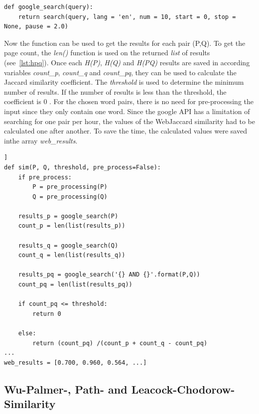 \documentclass[conference]{IEEEtran}
\begin{document}
\begin{lstlisting}[frame=single, label=lst:googlesearch, caption={Google search function}, captionpos=b]
def google_search(query):
    return search(query, lang = 'en', num = 10, start = 0, stop = None, pause = 2.0)
\end{lstlisting}

Now the function can be used to get the results for each pair (P,Q). To get the page count, the \textit{len()} function is used on the returned \textit{list} of results (see~\ref{lst:hpq}). Once each \textit{H(P)}, \textit{H(Q)} and \textit{H(PQ)} results are saved in according variables \textit{count\_p}, \textit{count\_q} and \textit{count\_pq}, they can be used to calculate the Jaccard similarity coefficient. The \textit{threshold} is used to determine the minimum number of results. If the number of results is less than the threshold, the coefficient is 0 \cite{websim}. For the chosen word pairs, there is no need for pre-processing the input since they only contain one word. Since the google API has a limitation of searching for one pair per hour, the values of the WebJaccard similarity had to be calculated one after another. To save the time, the calculated values were saved inthe array \textit{web\_results}.

\begin{lstlisting}[frame=single, label=lst:hpq, caption={Getting google results and calculation of WebJaccard similarity}, captionpos=b]]
def sim(P, Q, threshold, pre_process=False):
    if pre_process:
        P = pre_processing(P)
        Q = pre_processing(Q)

    results_p = google_search(P)
    count_p = len(list(results_p))

    results_q = google_search(Q)
    count_q = len(list(results_q))
    
    results_pq = google_search('{} AND {}'.format(P,Q))
    count_pq = len(list(results_pq))
    
    if count_pq <= threshold:
        return 0
    
    else:
        return (count_pq) /(count_p + count_q - count_pq)
...
web_results = [0.700, 0.960, 0.564, ...]
\end{lstlisting}

\subsection{Wu-Palmer-, Path- and Leacock-Chodorow-Similarity}\label{subsec:wup}
\end{document}

